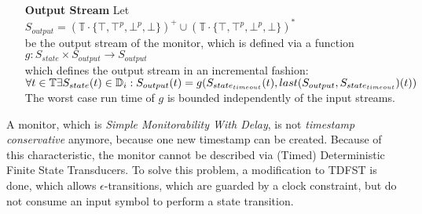 \begin{definition}
\begin{itemize}
			\item[\textbf{Output Stream}]
				Let $S_{output}= (\mathbb{T}\cdot \{\top, \top^p, \bot^p, \bot\})^+\cup(\mathbb{T}\cdot \{\top, \top^p, \bot^p, \bot\})^*$\\
				be the output stream of the monitor, which is defined via a function\\
				$g:S_{state}\times S_{output}\rightarrow S_{output}$\\
				which defines the output stream in an incremental fashion:\\
				\begin{math}
					\forall t\in \mathbb T \exists S_{state}(t)\in\mathbb D_i:\\
					S_{output}(t)= g(S_{state_{timeout}}(t), last(S_{output}, S_{state_{timeout}})(t))
				\end{math} \\
				The worst case run time of $g$ is bounded independently of the input streams.
		\end{itemize}
	\end{definition}
		A monitor, which is \textit{Simple Monitorability With Delay}, is not \textit{timestamp conservative} anymore, because one new timestamp can be created. Because of this characteristic, the monitor cannot be described via (Timed) Deterministic Finite State Transducers. To solve this problem, a modification to TDFST is done, which allows $\epsilon$-transitions, which are guarded by a clock constraint, but do not consume an input symbol to perform a state transition.
